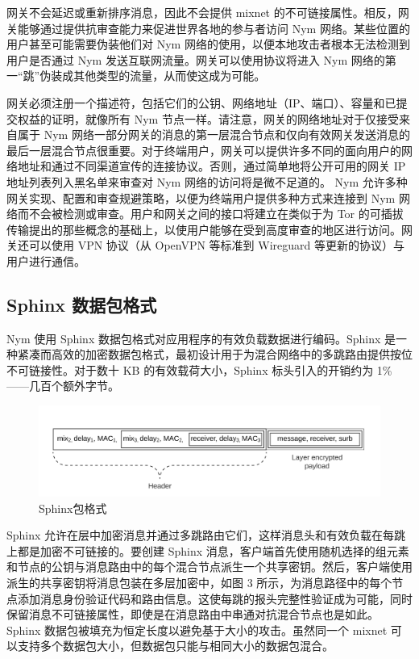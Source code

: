 \documentclass{article}
\begin{document}
	网关不会延迟或重新排序消息，因此不会提供 mixnet 的不可链接属性。相反，网关能够通过提供抗审查能力来促进世界各地的参与者访问 Nym 网络。某些位置的用户甚至可能需要伪装他们对 Nym 网络的使用，以便本地攻击者根本无法检测到用户是否通过 Nym 发送互联网流量。网关可以使用协议将进入 Nym 网络的第一“跳”伪装成其他类型的流量，从而使这成为可能。\newline

	网关必须注册一个描述符，包括它们的公钥、网络地址（IP、端口）、容量和已提交权益的证明，就像所有 Nym 节点一样。请注意，网关的网络地址对于仅接受来自属于 Nym 网络一部分网关的消息的第一层混合节点和仅向有效网关发送消息的最后一层混合节点很重要。对于终端用户，网关可以提供许多不同的面向用户的网络地址和通过不同渠道宣传的连接协议。否则，通过简单地将公开可用的网关 IP 地址列表列入黑名单来审查对 Nym 网络的访问将是微不足道的。 Nym 允许多种网关实现、配置和审查规避策略，以便为终端用户提供多种方式来连接到 Nym 网络而不会被检测或审查。用户和网关之间的接口将建立在类似于为 Tor 的可插拔传输提出的那些概念的基础上，以使用户能够在受到高度审查的地区进行访问\cite{ref11, ref81}。网关还可以使用 VPN 协议（从 OpenVPN 等标准到 Wireguard 等更新的协议）与用户进行通信。\newline

	\subsection{Sphinx 数据包格式}

	Nym 使用 Sphinx 数据包格式对应用程序的有效负载数据进行编码\cite{ref29}。Sphinx 是一种紧凑而高效的加密数据包格式，最初设计用于为混合网络中的多跳路由提供按位不可链接性。对于数十 KB 的有效载荷大小，Sphinx 标头引入的开销约为 1\%——几百个额外字节。\newline
	
\begin{figure}
\centering
\includegraphics[width=1\textwidth]{image3.png} %
\caption{Sphinx包格式} %
\label{图 3} %
\end{figure}

	Sphinx 允许在层中加密消息并通过多跳路由它们，这样消息头和有效负载在每跳上都是加密不可链接的。要创建 Sphinx 消息，客户端首先使用随机选择的组元素和节点的公钥与消息路由中的每个混合节点派生一个共享密钥。然后，客户端使用派生的共享密钥将消息包装在多层加密中，如图 3 所示，为消息路径中的每个节点添加消息身份验证代码和路由信息。这使每跳的报头完整性验证成为可能，同时保留消息不可链接属性，即使是在消息路由中串通对抗混合节点也是如此。Sphinx 数据包被填充为恒定长度以避免基于大小的攻击。虽然同一个 mixnet 可以支持多个数据包大小，但数据包只能与相同大小的数据包混合。\newline
\end{document}
